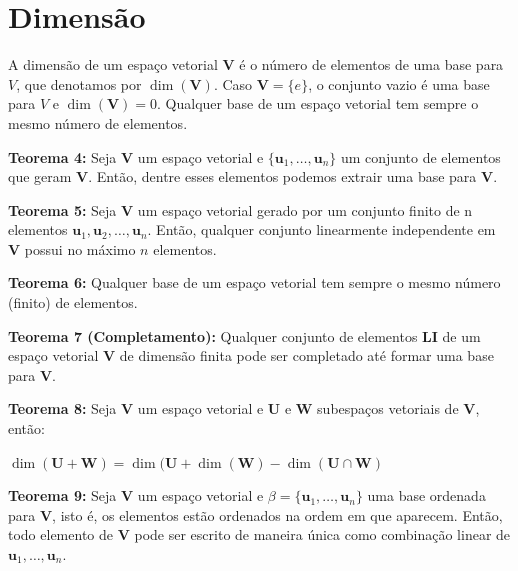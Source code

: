 \section{Dimensão}
A dimensão de um espaço vetorial $\mathbf{V}$ é o número de elementos de uma base para $V$, que denotamos por $\dim(\mathbf{V})$. Caso $\mathbf{V} = \{e\}$, o conjunto vazio é uma base para $V$ e $\dim(\mathbf{V}) = 0$. Qualquer base de um espaço vetorial tem sempre o mesmo número de elementos.

\noindent\textbf{Teorema 4:} Seja  $\mathbf{V}$ um espaço vetorial e $\{\mathbf{u}_1, \ldots, \mathbf{u}_n\}$ um conjunto de elementos que geram  $\mathbf{V}$. Então, dentre esses elementos podemos extrair uma base para $\mathbf{V}$.

\noindent\textbf{Teorema 5:} Seja $\mathbf{V}$ um espaço vetorial gerado por um conjunto finito de n elementos $\mathbf{u}_1, \mathbf{u}_2, \ldots, \mathbf{u}_n$. Então, qualquer conjunto linearmente independente em $\mathbf{V}$ possui no máximo $n$ elementos.

\noindent\textbf{Teorema 6:} Qualquer base de um espaço vetorial tem sempre o mesmo número (finito) de elementos.

\noindent\textbf{Teorema 7 (Completamento):} Qualquer conjunto de elementos \textbf{LI} de um espaço vetorial $\mathbf{V}$ de dimensão finita pode ser completado até formar uma base para $\mathbf{V}$.

\noindent\textbf{Teorema 8:} Seja $\mathbf{V}$ um espaço vetorial e $\mathbf{U}$ e $\mathbf{W}$ subespaços vetoriais de $\mathbf{V}$, então:

\centerline{$\dim(\mathbf{U} + \mathbf{W}) = \dim(\mathbf{U} + \dim(\mathbf{W}) - \dim(\mathbf{U} \cap \mathbf{W})$}
  
\noindent\textbf{Teorema 9:} Seja $\mathbf{V}$ um espaço vetorial e $\beta = \{\mathbf{u}_1, \ldots,\mathbf{u}_n\}$ uma base ordenada para $\mathbf{V}$, isto é, os elementos estão ordenados na ordem em que aparecem. Então, todo elemento de $\mathbf{V}$ pode ser escrito de maneira única como combinação linear de $\mathbf{u}_1, \ldots, \mathbf{u}_n$.

